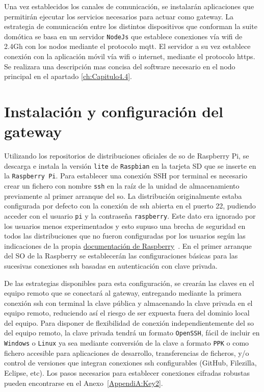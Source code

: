 Una vez establecidos los canales de comunicación, se instalarán aplicaciones que permitirán ejecutar los servicios necesarios para actuar como \gls{gateway}. La estrategia de comunicación entre los distintos dispositivos que conforman la suite domótica se basa en un servidor \verb|NodeJs| que establece conexiones vía \gls{wifi} de 2.4Gh con los nodos mediante el protocolo \gls{mqtt}. El servidor a su vez establece conexión con la aplicación móvil vía \gls{wifi} o internet, mediante el protocolo \gls{https}. Se realizara una descripción mas concisa del software necesario en el nodo principal en el apartado \ref{ch:Capitulo4.4}.


\section{Instalación y configuración del gateway}
\label{ch:Capitulo4.3}
 Utilizando los repositorios de distribuciones oficiales de \gls{so} de Raspberry Pi, se descarga e instala la versión \verb|lite| de \verb|Raspbian| en la tarjeta SD que se inserte en la \verb|Raspberry Pi|. Para establecer una conexión SSH por terminal es necesario crear un fichero con nombre \verb|ssh| en la raíz de la unidad de almacenamiento previamente al primer arranque del \gls{so}. La distribución originalmente estaba configurada por defecto con la conexión de \gls{ssh} abierta en el puerto 22, pudiendo acceder con el usuario \verb|pi| y la contraseña \verb|raspberry|. Este dato era ignorado por los usuarios menos experimentados y esto supuso una brecha de seguridad en todos las distribuciones que no fueron configuradas por los usuarios según las indicaciones de la propia \href{https://www.raspberrypi.org/documentation/configuration/security.md}{documentación de Raspberry}~\cite{securingyourraspberrypi}. En el primer arranque del SO de la Raspberry se establecerán las configuraciones básicas para las sucesivas conexiones \gls{ssh} basadas en autenticación con clave privada.
 
 \vspace{0.5cm}

 De las estrategias disponibles para esta configuración, se crearán las claves en el equipo remoto que se conectará al \gls{gateway}, entregando mediante la primera conexión \gls{ssh} con terminal la clave pública y almacenando la clave privada en el equipo remoto, reduciendo así el riesgo de ser expuesta fuera del dominio local del equipo. Para disponer de flexibilidad de conexión independientemente del \gls{so} del equipo remoto, la clave privada tendrá un formato \verb|OpenSSH|, fácil de incluir en \verb|Windows| o \verb|Linux| ya sea mediante conversión de la clave a formato \verb|PPK| o como fichero accesible para aplicaciones de desarrollo, transferencias de ficheros, y/o control de versiones que integran conexiones \gls{ssh} configurables (GitHub, Filezilla, Eclipse, etc). Los pasos necesarios para establecer conexiones cifradas robustas pueden encontrarse en el Anexo~\ref{AppendiA:Key2}.

